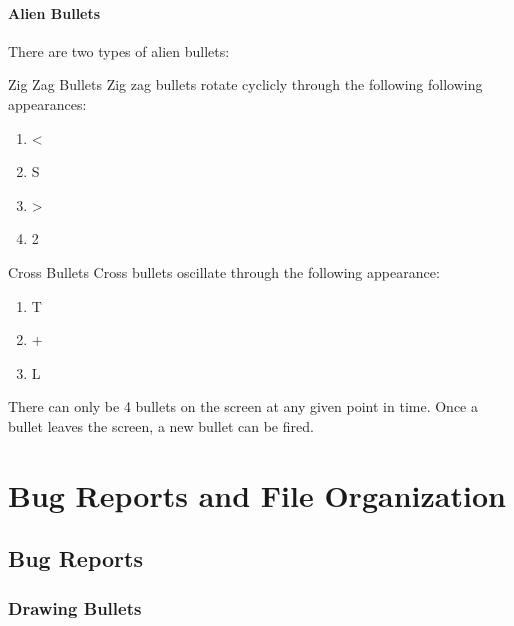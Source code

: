 \documentclass[11pt,letter,oneside]{report}
\begin{document}
\subsubsection{Alien Bullets}
There are two types of alien bullets:
\begin{description}
\item{Zig Zag Bullets}  Zig zag bullets rotate cyclicly through the following following appearances:

\begin{enumerate}
\item <
\item S
\item >
\item 2
\end{enumerate}

\item{Cross Bullets}  Cross bullets oscillate through the following appearance:

\begin{enumerate}
\item T
\item +
\item L
\end{enumerate}

\end{description}

There can only be 4 bullets on the screen at any given point in time.  Once a bullet leaves the screen, a new bullet can be fired.

\chapter{Bug Reports and File Organization}

\section{Bug Reports}

\subsection{Drawing Bullets}
\end{document}
